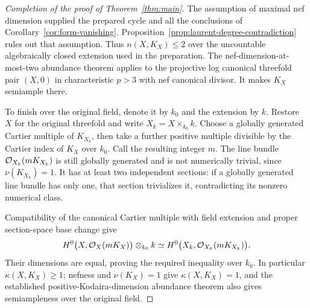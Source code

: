 \begin{proof}[Completion of the proof of Theorem~\ref{thm:main}]
The assumption of maximal nef dimension supplied the prepared
cycle and all the conclusions of
Corollary~\ref{cor:form-vanishing}.
Proposition~\ref{prop:laurent-degree-contradiction} rules out
that assumption.  Thus \(n(X,K_X)\le2\) over the uncountable
algebraically closed extension used in the preparation.  The
nef-dimension-at-most-two abundance theorem
\cite[Theorem~1.8]{xu2024} applies to the projective log
canonical threefold pair \((X,0)\) in characteristic \(p>3\)
with nef canonical divisor.  It makes \(K_X\) semiample there.

To finish over the original field, denote it by \(k_0\) and
the extension by \(k\).  Restore \(X\) for the original
threefold and write \(X_k=X\times_{k_0}k\).
Choose a globally generated Cartier multiple of \(K_{X_k}\),
then take a further positive multiple divisible by the Cartier
index of \(K_X\) over \(k_0\).  Call the resulting integer
\(m\).  The line bundle \(\mathcal O_{X_k}(mK_{X_k})\) is still
globally generated and is not numerically trivial, since
\(\nu(K_{X_k})=1\).  It has at least two independent sections:
if a globally generated line bundle has only one, that section
trivializes it, contradicting its nonzero numerical class.

Compatibility of the canonical Cartier multiple with field
extension and proper section-space base change give
\[
 H^0\bigl(X,\mathcal O_X(mK_X)\bigr)\otimes_{k_0}k
   \simeq
 H^0\bigl(X_k,\mathcal O_{X_k}(mK_{X_k})\bigr).
\]
Their dimensions are equal, proving the required inequality over
\(k_0\).  In particular \(\kappa(X,K_X)\ge1\); nefness and
\(\nu(K_X)=1\) give \(\kappa(X,K_X)=1\), and the established
positive-Kodaira-dimension abundance theorem
\cite[Theorem~1.6]{xu2024} also gives semiampleness over the
original field.
\end{proof}
